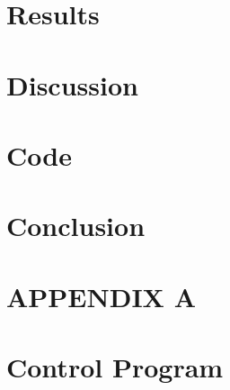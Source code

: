 \documentclass{article}
\begin{document}
\section{Results}
\label{sec:results}


\section{Discussion}
\label{sec:discussion}



\section{Code}
\label{sec:code}

\section{Conclusion}
\label{sec:conclusion}

%
%
 \newpage
\onecolumn
\appendix
\setcounter{table}{0}
\setcounter{figure}{0}
\setcounter{subsection}{0}
\makeatletter \renewcommand{\thefigure}{A.\@arabic\c@figure} \renewcommand{\thetable}{A.\@arabic\c@table} \renewcommand{\thesection}{A.\@arabic\c@section} \makeatother
\section*{APPENDIX A}

\section{Control Program}
%
 
\end{document}
